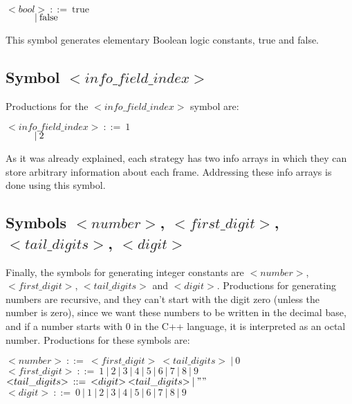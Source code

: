 \noindent
$ {<}bool{>}\:::=\:\text{true} $\\
$ \indent\indent |\:\text{false} $

This symbol generates elementary Boolean logic constants, true and false.

\subsection{Symbol ${<}info\_field\_index{>}$}
Productions for the ${<}info\_field\_index{>}$ symbol are:

\noindent
$ {<}info\_field\_index{>}\:::=\:\text{1} $\\
$ \indent\indent |\:\text{2} $

As it was already explained, each strategy has two info arrays in which they can store arbitrary information about each frame. Addressing these info arrays is done using this symbol.

\subsection{Symbols ${<}number{>}$, ${<}first\_digit{>}$, ${<}tail\_digits{>}$, ${<}digit{>}$}
Finally, the symbols for generating integer constants are ${<}number{>}$, ${<}first\_digit{>}$, ${<}tail\_digits{>}$ and ${<}digit{>}$. Productions for generating numbers are recursive, and they can't start with the digit zero (unless the number is zero), since we want these numbers to be written in the decimal base, and if a number starts with 0 in the C++ language, it is interpreted as an octal number. Productions for these symbols are:

\noindent
$ {<}number{>}\:::=\:{<}first\_digit{>}\:{<}tail\_digits{>}\:|\:\text{0} $\\
$ {<}first\_digit{>}\:::=\:\text{1}\:|\:\text{2}\:|\:\text{3}\:|\:\text{4}\:|\:\text{5}\:|\:\text{6}\:|\:\text{7}\:|\:\text{8}\:|\:\text{9} $\\
$ {<}tail\_digits{>}\:::=\:{<}digit{>}\:{<}tail\_digits{>}\:|\:"" $\\
$ {<}digit{>}\:::=\:\text{0}\:|\:\text{1}\:|\:\text{2}\:|\:\text{3}\:|\:\text{4}\:|\:\text{5}\:|\:\text{6}\:|\:\text{7}\:|\:\text{8}\:|\:\text{9} $
